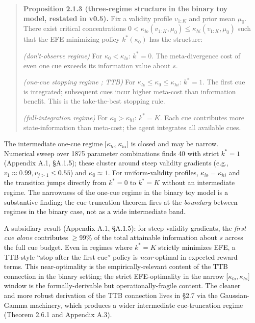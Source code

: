 \documentclass{article}
\begin{document}
\begin{quote}
\textbf{Proposition 2.1.3 (three-regime structure in the binary toy
model, restated in v0.5).} Fix a validity profile \(v_{1:K}\) and prior
mean \(\mu_{0}\). There exist critical concentrations
\(0 < \kappa_{lo}(v_{1:K},\mu_{0}) \leq \kappa_{hi}(v_{1:K},\mu_{0})\)
such that the EFE-minimizing policy \(k^{*}(\kappa_{0})\) has the
structure:

\emph{(don't-observe regime)} For \(\kappa_{0} < \kappa_{lo}\):
\(k^{*} = 0\). The meta-divergence cost of even one cue exceeds its
information value about \(s\).

\emph{(one-cue stopping regime ; TTB)} For
\(\kappa_{lo} \leq \kappa_{0} \leq \kappa_{hi}\): \(k^{*} = 1\). The
first cue is integrated; subsequent cues incur higher meta-cost than
information benefit. This is the take-the-best stopping rule.

\emph{(full-integration regime)} For \(\kappa_{0} > \kappa_{hi}\):
\(k^{*} = K\). Each cue contributes more state-information than
meta-cost; the agent integrates all available cues.
\end{quote}

The intermediate one-cue regime
\(\lbrack\kappa_{lo},\kappa_{hi}\rbrack\) is closed and may be narrow.
Numerical sweep over 1875 parameter combinations finds 40 with strict
\(k^{*} = 1\) (Appendix A.1, \S{}A.1.5); these cluster around steep
validity gradients (e.g., \(v_{1} \approx 0.99,v_{j > 1} \leq 0.55\))
and \(\kappa_{0} \approx 1\). For uniform-validity profiles,
\(\kappa_{lo} = \kappa_{hi}\) and the transition jumps directly from
\(k^{*} = 0\) to \(k^{*} = K\) without an intermediate regime. The
narrowness of the one-cue regime in the binary toy model is a
substantive finding; the cue-truncation theorem fires at the
\emph{boundary} between regimes in the binary case, not as a wide
intermediate band.

A subsidiary result (Appendix A.1, \S{}A.1.5): for steep validity
gradients, the \emph{first cue alone} contributes \ensuremath{\geq}99\% of the total
attainable information about \(s\) across the full cue budget. Even in
regimes where \(k^{*} = K\) strictly minimizes EFE, a TTB-style ``stop
after the first cue'' policy is \emph{near}-optimal in expected reward
terms. This near-optimality is the empirically-relevant content of the
TTB connection in the binary setting; the strict EFE-optimality in the
narrow \(\lbrack\kappa_{lo},\kappa_{hi}\rbrack\) window is the
formally-derivable but operationally-fragile content. The cleaner and
more robust derivation of the TTB connection lives in \S{}2.7 via the
Gaussian-Gamma machinery, which produces a wider intermediate
cue-truncation regime (Theorem 2.6.1 and Appendix A.3).
\end{document}
